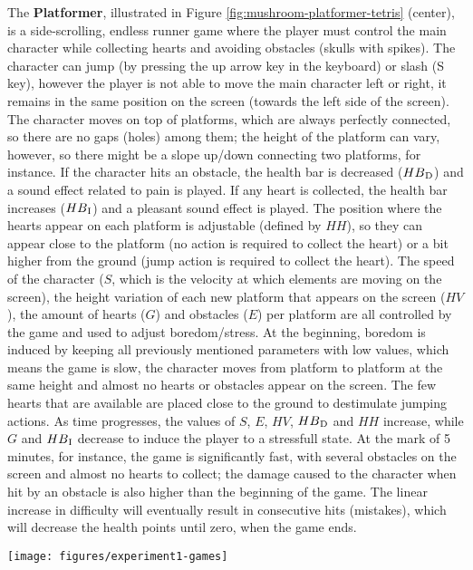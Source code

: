 The \textbf{Platformer}, illustrated in Figure \ref{fig:mushroom-platformer-tetris} (center), is a side-scrolling, endless runner game where the player must control the main character while collecting hearts and avoiding obstacles (skulls with spikes). The character can jump (by pressing the up arrow key in the keyboard) or slash (S key), however the player is not able to move the main character left or right, it remains in the same position on the screen (towards the left side of the screen). The character moves on top of platforms, which are always perfectly connected, so there are no gaps (holes) among them; the height of the platform can vary, however, so there might be a slope up/down connecting two platforms, for instance. If the character hits an obstacle, the health bar is decreased ($HB\textsubscript{D}$) and a sound effect related to pain is played. If any heart is collected, the health bar increases ($HB\textsubscript{I}$) and a pleasant sound effect is played. The position where the hearts appear on each platform is adjustable (defined by $HH$), so they can appear close to the platform (no action is required to collect the heart) or a bit higher from the ground (jump action is required to collect the heart). The speed of the character ($S$, which is the velocity at which elements are moving on the screen), the height variation of each new platform that appears on the screen ($HV$), the amount of hearts ($G$) and obstacles ($E$) per platform are all controlled by the game and used to adjust boredom/stress. At the beginning, boredom is induced by keeping all previously mentioned parameters with low values, which means the game is slow, the character moves from platform to platform at the same height and almost no hearts or obstacles appear on the screen. The few hearts that are available are placed close to the ground to destimulate jumping actions. As time progresses, the values of $S$, $E$, $HV$, $HB\textsubscript{D}$ and $HH$ increase, while $G$ and $HB\textsubscript{I}$ decrease to induce the player to a stressfull state. At the mark of 5 minutes, for instance, the game is significantly fast, with several obstacles on the screen and almost no hearts to collect; the damage caused to the character when hit by an obstacle is also higher than the beginning of the game. The linear increase in difficulty will eventually result in consecutive hits (mistakes), which will decrease the health points until zero, when the game ends.

\begin{figure*}[!t]
\centering
\texttt{[image: figures/experiment1-games]}
\caption{Mushroom (left), Platformer (center) and Tetris (right). In Mushroom, player has to drag and drop the correct mushrooms into the character, discarding the wrong ones into the trash. In Platformer, the player has to jump over or slide under obstacles while collecting hearts. In our version of Tetris, there are no hints about the next piece to be added to the screen}
\label{fig:mushroom-platformer-tetris}
\end{figure*}

